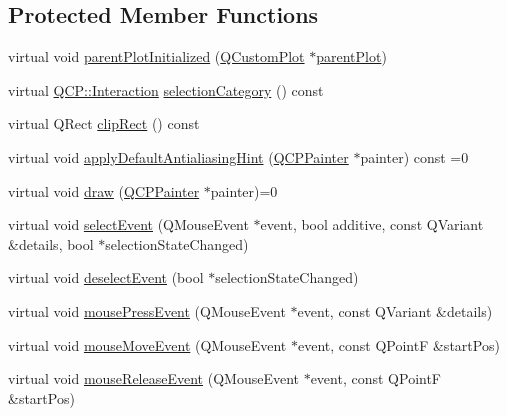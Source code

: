 \subsection*{Protected Member Functions}
\begin{DoxyCompactItemize}
\item 
virtual void \mbox{\hyperlink{class_q_c_p_layerable_ab20b7dbd8e0249ed61adb9622c427382}{parent\+Plot\+Initialized}} (\mbox{\hyperlink{class_q_custom_plot}{Q\+Custom\+Plot}} $\ast$\mbox{\hyperlink{class_q_c_p_layerable_a473edb813a4c1929d6b6a8fe3ff3faf7}{parent\+Plot}})
\item 
virtual \mbox{\hyperlink{namespace_q_c_p_a2ad6bb6281c7c2d593d4277b44c2b037}{Q\+C\+P\+::\+Interaction}} \mbox{\hyperlink{class_q_c_p_layerable_a908c9edda761886f33893be326dab77d}{selection\+Category}} () const
\item 
virtual Q\+Rect \mbox{\hyperlink{class_q_c_p_layerable_acbcfc9ecc75433747b1978a77b1864b3}{clip\+Rect}} () const
\item 
virtual void \mbox{\hyperlink{class_q_c_p_layerable_afdf83ddc6a265cbf4c89fe99d3d93473}{apply\+Default\+Antialiasing\+Hint}} (\mbox{\hyperlink{class_q_c_p_painter}{Q\+C\+P\+Painter}} $\ast$painter) const =0
\item 
virtual void \mbox{\hyperlink{class_q_c_p_layerable_aecf2f7087482d4b6a78cb2770e5ed12d}{draw}} (\mbox{\hyperlink{class_q_c_p_painter}{Q\+C\+P\+Painter}} $\ast$painter)=0
\item 
virtual void \mbox{\hyperlink{class_q_c_p_layerable_a7498c2d0d081cf7cad0fb3bb93aa0e91}{select\+Event}} (Q\+Mouse\+Event $\ast$event, bool additive, const Q\+Variant \&details, bool $\ast$selection\+State\+Changed)
\item 
virtual void \mbox{\hyperlink{class_q_c_p_layerable_ae546370644a5551c76af739afc008bee}{deselect\+Event}} (bool $\ast$selection\+State\+Changed)
\item 
virtual void \mbox{\hyperlink{class_q_c_p_layerable_af6567604818db90f4fd52822f8bc8376}{mouse\+Press\+Event}} (Q\+Mouse\+Event $\ast$event, const Q\+Variant \&details)
\item 
virtual void \mbox{\hyperlink{class_q_c_p_layerable_a9eee1ba47fd69be111059ca3881933e4}{mouse\+Move\+Event}} (Q\+Mouse\+Event $\ast$event, const Q\+PointF \&start\+Pos)
\item 
virtual void \mbox{\hyperlink{class_q_c_p_layerable_aa0d79b005686f668622bbe66ac03ba2c}{mouse\+Release\+Event}} (Q\+Mouse\+Event $\ast$event, const Q\+PointF \&start\+Pos)
\item 

\end{DoxyCompactItemize}
